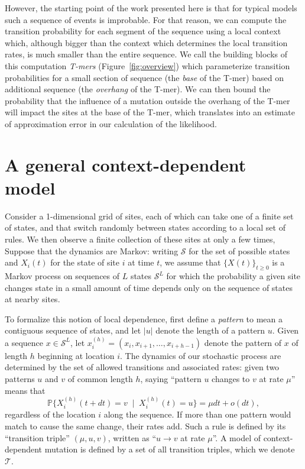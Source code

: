 \documentclass{article}
\renewcommand{\P}{\mathbb{P}}
\newcommand{\calS}{\mathcal{S}}  %
\newcommand{\calT}{\mathcal{T}}  %
\newcommand{\given}{\;\mid\;}
\theoremstyle{plain}
\theoremstyle{definition}
\begin{document}
However, the starting point of the work presented here is that
for typical models such a sequence of events is improbable.
For that reason, we can compute the transition probability for each segment of the sequence
using a local context which,
although bigger than the context which determines the local transition rates,
is much smaller than the entire sequence.
We call the building blocks of this computation \emph{T-mers} (Figure~\ref{fig:overview})
which parameterize transition probabilities for a small section of sequence
(the \emph{base} of the T-mer) based on additional sequence (the \emph{overhang} of the T-mer).
We can then bound the probability that the influence of a mutation
outside the overhang of the T-mer will impact the sites at the base of the T-mer,
which translates into an estimate of approximation error in our calculation of the likelihood.

\section{A general context-dependent model}

Consider a 1-dimensional grid of sites, each of which can take one of a finite set of states,
and that switch randomly between states according to a local set of rules.
We then observe a finite collection of these sites at only a few times,
Suppose that the dynamics are Markov:
writing $\calS$ for the set of possible states
and $X_i(t)$ for the state of site $i$ at time $t$,
we assume that $\{X(t)\}_{t \ge 0}$ is a Markov process on sequences of $L$ states $\calS^L$
for which the probability a given site changes state in a small amount of time
depends only on the sequence of states at nearby sites.

To formalize this notion of local dependence,
first define a \textit{pattern} to mean a contiguous sequence of states,
and let $|u|$ denote the length of a pattern $u$.
Given a sequence $x \in \calS^L$,
let $x_i^{(h)} = (x_i, x_{i+1}, \ldots, x_{i+h-1})$ denote the pattern of $x$ of length $h$ beginning at location $i$.
The dynamics of our stochastic process
are determined by the set of allowed transitions and associated rates:
given two patterns $u$ and $v$ of common length $h$,
saying ``pattern $u$ changes to $v$ at rate $\mu$'' means that
\[
    \P\{ X_i^{(h)}(t+dt) = v \given X_i^{(h)}(t) = u \} = \mu dt + o(dt),
\]
regardless of the location $i$ along the sequence.
If more than one pattern would match to cause the same change, their rates add.
Such a rule is defined by its ``transition triple'' $(\mu,u,v)$,
written as ``$u \to v$ at rate $\mu$''.
A model of context-dependent mutation
is defined by a set of all transition triples,
which we denote $\calT$.
\end{document}

